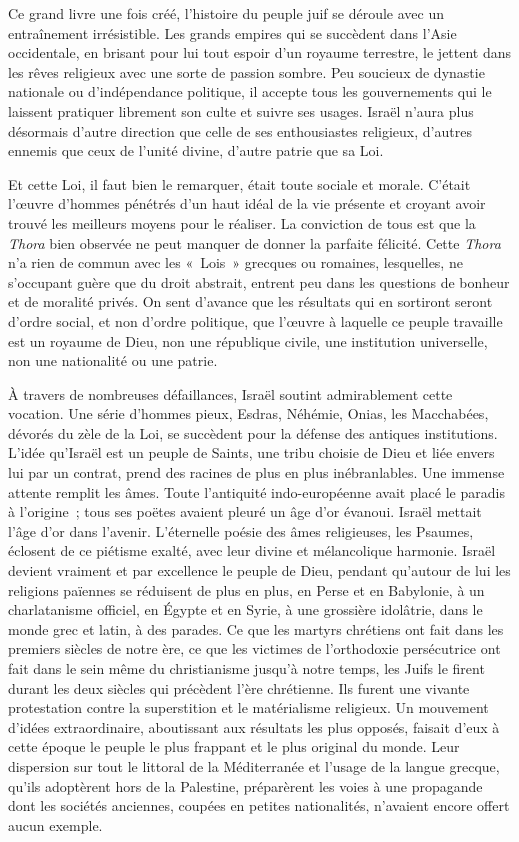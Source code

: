 \documentclass[french,twoside]{book} %
\begin{document}
Ce grand livre une fois créé, l’histoire du peuple juif se déroule avec un entraînement irrésistible. Les grands empires qui se succèdent dans l’Asie occidentale, en brisant pour lui tout espoir d’un royaume terrestre, le jettent dans les rêves religieux avec une sorte de passion sombre. Peu soucieux de dynastie nationale ou d’indépendance politique, il accepte tous les gouvernements qui le laissent pratiquer librement son culte et suivre ses usages. Israël n’aura plus désormais d’autre direction que celle de ses enthousiastes religieux, d’autres ennemis que ceux de l’unité divine, d’autre patrie que sa Loi.\par
Et cette Loi, il faut bien le remarquer, était toute sociale et morale. C’était l’œuvre d’hommes pénétrés d’un haut idéal de la vie présente et croyant avoir trouvé les meilleurs moyens pour le réaliser. La conviction de tous est que la {\itshape Thora} bien observée ne peut manquer de donner la parfaite félicité. Cette {\itshape Thora} n’a rien de commun avec les « Lois » grecques ou romaines, lesquelles, ne s’occupant guère que du droit abstrait, entrent peu dans les questions de bonheur et de moralité privés. On sent d’avance que les résultats qui en sortiront seront d’ordre social, et non d’ordre politique, que l’œuvre à laquelle ce peuple travaille est un royaume de Dieu, non une république civile, une institution universelle, non une nationalité ou une patrie.\par
À travers de nombreuses défaillances, Israël soutint admirablement cette vocation. Une série d’hommes pieux, Esdras, Néhémie, Onias, les Macchabées, dévorés du zèle de la Loi, se succèdent pour la défense des antiques institutions. L’idée qu’Israël est un peuple de Saints, une tribu choisie de Dieu et liée envers lui par un contrat, prend des racines de plus en plus inébranlables. Une immense attente remplit les âmes. Toute l’antiquité indo-européenne avait placé le paradis à l’origine ; tous ses poëtes avaient pleuré un âge d’or évanoui. Israël mettait l’âge d’or dans l’avenir. L’éternelle poésie des âmes religieuses, les Psaumes, éclosent de ce piétisme exalté, avec leur divine et mélancolique harmonie. Israël devient vraiment et par excellence le peuple de Dieu, pendant qu’autour de lui les religions païennes se réduisent de plus en plus, en Perse et en Babylonie, à un charlatanisme officiel, en Égypte et en Syrie, à une grossière idolâtrie, dans le monde grec et latin, à des parades. Ce que les martyrs chrétiens ont fait dans les premiers siècles de notre ère, ce que les victimes de l’orthodoxie persécutrice ont fait dans le sein même du christianisme jusqu’à notre temps, les Juifs le firent durant les deux siècles qui précèdent l’ère chrétienne. Ils furent une vivante protestation contre la superstition et le matérialisme religieux. Un mouvement d’idées extraordinaire, aboutissant aux résultats les plus opposés, faisait d’eux à cette époque le peuple le plus frappant et le plus original du monde. Leur dispersion sur tout le littoral de la Méditerranée et l’usage de la langue grecque, qu’ils adoptèrent hors de la Palestine, préparèrent les voies à une propagande dont les sociétés anciennes, coupées en petites nationalités, n’avaient encore offert aucun exemple.\par
\end{document}

